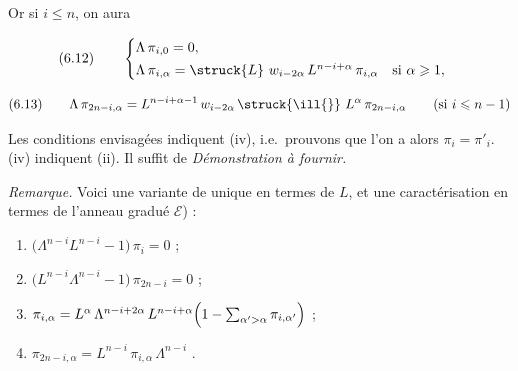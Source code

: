 
Or si $i \leqslant n$, on aura

\[ (6.12) \qquad \begin{cases} \Lambda\, \pi_{i,0} = 0 , \\[2pt] \Lambda\, \pi_{i,\alpha} = \struck{L}\ w_{i-2\alpha}\, L^{n-i+\alpha}\, \pi_{i,\alpha} \quad \text{si } \alpha \geqslant 1 , \end{cases} \]


\[ (6.13) \qquad \Lambda\, \pi_{2n-i,\alpha} = L^{n-i+\alpha-1}\, w_{i-2\alpha}\, \struck{\ill{}}\ L^{\alpha}\, \pi_{2n-i,\alpha} \qquad (\text{si } i \leqslant n-1) \]

Les conditions envisagées indiquent \ill{} (iv), i.e.\ prouvons que l'on a
alors $\pi_{i} = \pi'_{i}$. (iv) indiquent (ii). Il suffit de \ill{}
\emph{Démonstration à fournir.}

\emph{Remarque.} Voici une \ill{} variante de \ill{} unique \ill{} en termes
de $L$, et \ill{} une caractérisation \ill{} en termes de l'anneau gradué
$\mathcal{E}$) :



\begin{enumerate}
  \item $\bigl( \Lambda^{n-i} L^{n-i} - 1 \bigr)\, \pi_{i} = 0$ ;
  \item $\bigl( L^{n-i} \Lambda^{n-i} - 1 \bigr)\, \pi_{2n-i} = 0$ ;
  \item $\pi_{i,\alpha} = L^{\alpha}\, \Lambda^{n-i+2\alpha}\, L^{n-i+\alpha} \Bigl( 1 - \sum_{\alpha' > \alpha} \pi_{i,\alpha'} \Bigr)$ ;
  \item $\pi_{2n-i,\alpha} = L^{n-i}\, \pi_{i,\alpha}\, \Lambda^{n-i}$ .
\end{enumerate}

